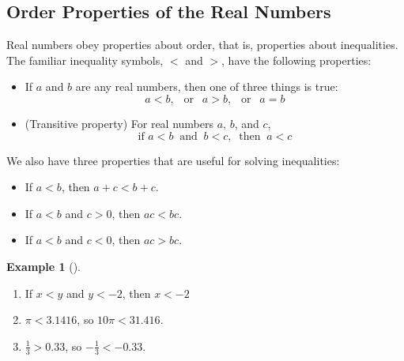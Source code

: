 \documentclass[10pt,]{book}
\theoremstyle{plain}
\theoremstyle{definition}
\theoremstyle{definition}
\newtheorem{example}[theorem]{Example}
\theoremstyle{definition}
\numberwithin{equation}{part}
\newcommand{\lt}{<}
\newcommand{\gt}{>}
\begin{document}
\subsection[{Order Properties of the Real Numbers}]{Order Properties of the Real Numbers}\label{subsection-63}
Real numbers obey properties about order, that is, properties about inequalities. The familiar inequality symbols, \(\lt\) and \(\gt\), have the following properties: \leavevmode%
\begin{itemize}[label=\textbullet]
\item{}If \(a\) and \(b\) are any real numbers, then one of three things is true:%
\begin{equation*}
a \lt b, ~~\text{ or }~~ a\gt b, ~~\text{ or }~~  a = b
\end{equation*}
%
\item{}(Transitive property) For real numbers \(a\), \(b\), and \(c\),%
\begin{equation*}
\text{if } a \lt b ~\text{ and }~ b \lt c, ~\text{ then }~ a \lt c
\end{equation*}
%
\end{itemize}
 We also have three properties that are useful for solving inequalities: \leavevmode%
\begin{itemize}[label=\textbullet]
\item{}If \(a\lt b\), then \(a+c\lt b+c\).%
\item{}If \(a\lt b\) and \(c\gt 0\), then \(ac \lt bc\).%
\item{}If \(a\lt b\) and \(c\lt 0\), then \(ac\gt bc\).%
\end{itemize}
%
\begin{example}[]\label{example-92}
\leavevmode%
\begin{enumerate}[label=*\alph**]
\item\hypertarget{li-402}{}If \(x\lt y\) and \(y\lt -2\), then \(x\lt -2\)%
\item\hypertarget{li-403}{}\(\pi \lt 3.1416\), so \(10\pi\lt 31.416\).%
\item\hypertarget{li-404}{}\(\frac{1}{3}\gt 0.33\), so \(−\frac{1}{3}\lt −0.33.\)%
\end{enumerate}
%
\end{example}
\typeout{************************************************}
\typeout{************************************************}
\end{document}
